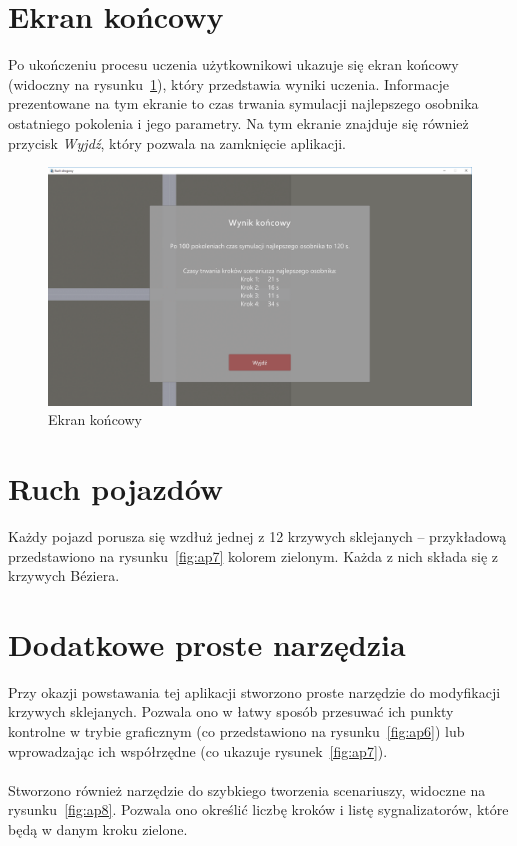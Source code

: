 \section*{Ekran końcowy}
Po ukończeniu procesu uczenia użytkownikowi ukazuje się ekran końcowy (widoczny na rysunku~\ref{fig:ap9}), który przedstawia wyniki uczenia. Informacje prezentowane na tym ekranie to czas trwania symulacji najlepszego osobnika ostatniego pokolenia i jego parametry. Na tym ekranie znajduje się również przycisk \textit{Wyjdź}, który pozwala na zamknięcie aplikacji.
\begin{figure}
	\centering
	\includegraphics[width=1\linewidth]{ap9}
	\caption[Ekran końcowy]{Ekran końcowy}
	\label{fig:ap9}
\end{figure}

\section*{Ruch pojazdów}
Każdy pojazd porusza się wzdłuż jednej z 12 krzywych sklejanych -- przykładową przedstawiono na rysunku~\ref{fig:ap7} kolorem zielonym. Każda z nich składa się z krzywych Béziera.
\section*{Dodatkowe proste narzędzia}Przy okazji powstawania tej aplikacji stworzono proste narzędzie do modyfikacji krzywych sklejanych. Pozwala ono w łatwy sposób przesuwać ich punkty kontrolne w trybie graficznym (co przedstawiono na rysunku~\ref{fig:ap6}) lub wprowadzając ich współrzędne (co ukazuje rysunek~\ref{fig:ap7}).
\paragraph{}Stworzono również narzędzie do szybkiego tworzenia scenariuszy, widoczne na rysunku~\ref{fig:ap8}. Pozwala ono określić liczbę kroków i listę sygnalizatorów, które będą w danym kroku zielone.
